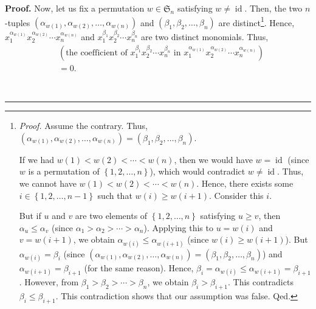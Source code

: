 \documentclass[numbers=enddot,12pt,final,onecolumn,notitlepage]{scrartcl}%
\theoremstyle{definition}
\newenvironment{proof}[1][Proof]{\noindent\textbf{#1.} }{\ \rule{0.5em}{0.5em}}
\newenvironment{verlong}{}{}
\begin{document}
\begin{proof}
\begin{verlong}
Now, let us fix a permutation $w\in\mathfrak{S}_{n}$ satisfying $w\neq
\operatorname*{id}$. Then, the two $n$-tuples $\left(  \alpha_{w\left(
1\right)  },\alpha_{w\left(  2\right)  },\ldots,\alpha_{w\left(  n\right)
}\right)  $ and $\left(  \beta_{1},\beta_{2},\ldots,\beta_{n}\right)  $ are
distinct\footnote{\textit{Proof.} Assume the contrary. Thus, $\left(
\alpha_{w\left(  1\right)  },\alpha_{w\left(  2\right)  },\ldots
,\alpha_{w\left(  n\right)  }\right)  =\left(  \beta_{1},\beta_{2}%
,\ldots,\beta_{n}\right)  $.
\par
If we had $w\left(  1\right)  <w\left(  2\right)  <\cdots<w\left(  n\right)
$, then we would have $w=\operatorname*{id}$ (since $w$ is a permutation of
$\left\{  1,2,\ldots,n\right\}  $), which would contradict $w\neq
\operatorname*{id}$. Thus, we cannot have $w\left(  1\right)  <w\left(
2\right)  <\cdots<w\left(  n\right)  $. Hence, there exists some $i\in\left\{
1,2,\ldots,n-1\right\}  $ such that $w\left(  i\right)  \geq w\left(
i+1\right)  $. Consider this $i$.
\par
But if $u$ and $v$ are two elements of $\left\{  1,2,\ldots,n\right\}  $
satisfying $u\geq v$, then $\alpha_{u}\leq\alpha_{v}$ (since $\alpha
_{1}>\alpha_{2}>\cdots>\alpha_{n}$). Applying this to $u=w\left(  i\right)  $
and $v=w\left(  i+1\right)  $, we obtain $\alpha_{w\left(  i\right)  }%
\leq\alpha_{w\left(  i+1\right)  }$ (since $w\left(  i\right)  \geq w\left(
i+1\right)  $). But $\alpha_{w\left(  i\right)  }=\beta_{i}$ (since $\left(
\alpha_{w\left(  1\right)  },\alpha_{w\left(  2\right)  },\ldots
,\alpha_{w\left(  n\right)  }\right)  =\left(  \beta_{1},\beta_{2}%
,\ldots,\beta_{n}\right)  $) and $\alpha_{w\left(  i+1\right)  }=\beta_{i+1}$
(for the same reason). Hence, $\beta_{i}=\alpha_{w\left(  i\right)  }%
\leq\alpha_{w\left(  i+1\right)  }=\beta_{i+1}$. However, from $\beta
_{1}>\beta_{2}>\cdots>\beta_{n}$, we obtain $\beta_{i}>\beta_{i+1}$. This
contradicts $\beta_{i}\leq\beta_{i+1}$. This contradiction shows that our
assumption was false. Qed.}. Hence, $x_{1}^{\alpha_{w\left(  1\right)  }}%
x_{2}^{\alpha_{w\left(  2\right)  }}\cdots x_{n}^{\alpha_{w\left(  n\right)
}}$ and $x_{1}^{\beta_{1}}x_{2}^{\beta_{2}}\cdots x_{n}^{\beta_{n}}$ are two
distinct monomials. Thus,%
\begin{align}
&  \left(  \text{the coefficient of }x_{1}^{\beta_{1}}x_{2}^{\beta_{2}}\cdots
x_{n}^{\beta_{n}}\text{ in }x_{1}^{\alpha_{w\left(  1\right)  }}x_{2}%
^{\alpha_{w\left(  2\right)  }}\cdots x_{n}^{\alpha_{w\left(  n\right)  }%
}\right) \nonumber\\
&  =0. \label{pf.lem.alt.linind.coeff-kron.pf.4}%
\end{align}



\end{verlong}
\end{proof}
\end{document}
